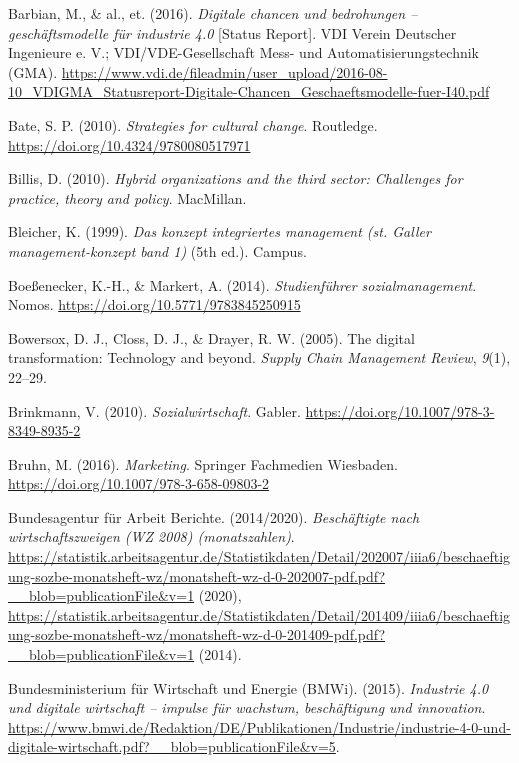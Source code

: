\documentclass[
  letterpaper,
]{book}
\newlength{\cslhangindent}
\newenvironment{CSLReferences}[2] %
 {\begin{list}{}{%
  \setlength{\itemindent}{0pt}
  \setlength{\leftmargin}{0pt}
  \setlength{\parsep}{0pt}
  \ifodd #1
   \setlength{\leftmargin}{\cslhangindent}
   \setlength{\itemindent}{-1\cslhangindent}
  \fi
  \setlength{\itemsep}{#2\baselineskip}}}
 {\end{list}}
\begin{document}
\begin{CSLReferences}{1}{0}
Barbian, M., \& al., et. (2016). \emph{Digitale chancen und bedrohungen
-- geschäftsmodelle für industrie 4.0} {[}Status Report{]}. VDI Verein
Deutscher Ingenieure e. V.; VDI/VDE-Gesellschaft Mess- und
Automatisierungstechnik (GMA).
\url{https://www.vdi.de/fileadmin/user_upload/2016-08-10_VDIGMA_Statusreport-Digitale-Chancen_Geschaeftsmodelle-fuer-I40.pdf}

Bate, S. P. (2010). \emph{Strategies for cultural change}. Routledge.
\url{https://doi.org/10.4324/9780080517971}

Billis, D. (2010). \emph{Hybrid organizations and the third sector:
Challenges for practice, theory and policy}. MacMillan.

Bleicher, K. (1999). \emph{Das konzept integriertes management (st.
Galler management-konzept band 1)} (5th ed.). Campus.

Boeßenecker, K.-H., \& Markert, A. (2014). \emph{Studienführer
sozialmanagement}. Nomos. \url{https://doi.org/10.5771/9783845250915}

Bowersox, D. J., Closs, D. J., \& Drayer, R. W. (2005). The digital
transformation: Technology and beyond. \emph{Supply Chain Management
Review}, \emph{9}(1), 22--29.

Brinkmann, V. (2010). \emph{Sozialwirtschaft}. Gabler.
\url{https://doi.org/10.1007/978-3-8349-8935-2}

Bruhn, M. (2016). \emph{Marketing}. Springer Fachmedien Wiesbaden.
\url{https://doi.org/10.1007/978-3-658-09803-2}

Bundesagentur für Arbeit Berichte. (2014/2020). \emph{Beschäftigte nach
wirtschaftszweigen (WZ 2008) (monatszahlen)}.
\url{https://statistik.arbeitsagentur.de/Statistikdaten/Detail/202007/iiia6/beschaeftigung-sozbe-monatsheft-wz/monatsheft-wz-d-0-202007-pdf.pdf?__blob=publicationFile&v=1}
(2020),
\url{https://statistik.arbeitsagentur.de/Statistikdaten/Detail/201409/iiia6/beschaeftigung-sozbe-monatsheft-wz/monatsheft-wz-d-0-201409-pdf.pdf?__blob=publicationFile&v=1}
(2014).

Bundesministerium für Wirtschaft und Energie (BMWi). (2015).
\emph{Industrie 4.0 und digitale wirtschaft -- impulse für wachstum,
beschäftigung und innovation}.
\url{https://www.bmwi.de/Redaktion/DE/Publikationen/Industrie/industrie-4-0-und-digitale-wirtschaft.pdf?__blob=publicationFile&v=5}.


\end{CSLReferences}
\end{document}
